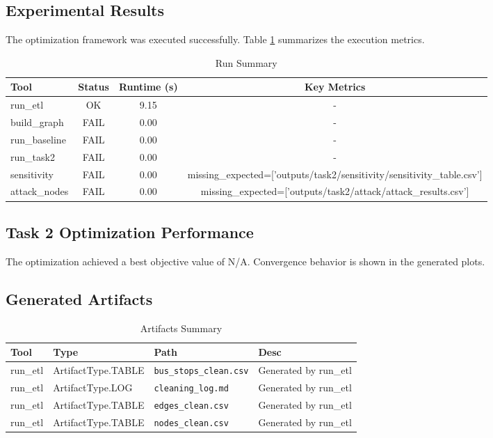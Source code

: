 
\subsection{Experimental Results}
The optimization framework was executed successfully.
Table \ref{tab:run_summary} summarizes the execution metrics.

\begin{table}[ht]
    \centering
    \caption{Run Summary}
    \label{tab:run_summary}
    \begin{tabular}{lccc}
        \toprule
        Tool & Status & Runtime (s) & Key Metrics \\
        \midrule
        run\_etl & OK & 9.15 & - \\
        build\_graph & FAIL & 0.00 & - \\
        run\_baseline & FAIL & 0.00 & - \\
        run\_task2 & FAIL & 0.00 & - \\
        sensitivity & FAIL & 0.00 & missing\_expected=['outputs/task2/sensitivity/sensitivity\_table.csv'] \\
        attack\_nodes & FAIL & 0.00 & missing\_expected=['outputs/task2/attack/attack\_results.csv'] \\
        \bottomrule
    \end{tabular}
\end{table}

\subsection{Task 2 Optimization Performance}
The optimization achieved a best objective value of N/A.
Convergence behavior is shown in the generated plots.


\subsection{Generated Artifacts}
\begin{table}[ht]
\centering\caption{Artifacts Summary}\scriptsize
\begin{tabular}{llp{6cm}l}
\toprule
Tool & Type & Path & Desc \\
\midrule
run\_etl & ArtifactType.TABLE & \texttt{bus\_stops\_clean.csv} & Generated by run\_etl \\
run\_etl & ArtifactType.LOG & \texttt{cleaning\_log.md} & Generated by run\_etl \\
run\_etl & ArtifactType.TABLE & \texttt{edges\_clean.csv} & Generated by run\_etl \\
run\_etl & ArtifactType.TABLE & \texttt{nodes\_clean.csv} & Generated by run\_etl \\
\bottomrule
\end{tabular}
\end{table}
